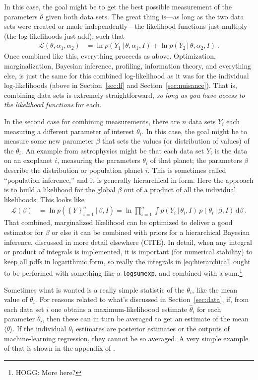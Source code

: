 \documentclass{article}
\newcommand{\sectionname}{Section}
\newcommand{\secref}[1]{\sectionname~\ref{#1}}
\newcommand{\dd}{\mathrm{d}}
\newcommand{\given}{\,|\,}
\newcommand{\setof}[1]{\left\{{#1}\right\}}
\begin{document}
In this case, the goal might be to get the best possible measurement of the parameters $\theta$ given both data sets.
The great thing is---as long as the two data sets were created or made independently---the likelihood functions just multiply (the log likelihoods just add), such that
\begin{align}
    \mathscr{L}(\theta,\alpha_1,\alpha_2) &= \ln p(Y_1\given\theta,\alpha_1,I) + \ln p(Y_2\given\theta,\alpha_2,I) ~.\label{eq:combineLFs}
\end{align}
Once combined like this, everything proceeds as above.
Optimization, marginalization, Bayesian inference, profiling, information theory, and everything else, is just the same for this combined log-likelihood as it was for the individual log-likelihoods (above in \secref{sec:lf} and \secref{sec:nuisance}).
That is, combining data sets is extremely straightforward, \emph{so long as you have access to the likelihood functions} for each.

In the second case for combining measurements, there are $n$ data sets $Y_i$ each measuring a different parameter of interest $\theta_i$.
In this case, the goal might be to measure some new parameter $\beta$ that sets the values (or distribution of values) of the $\theta_i$.
An example from astrophysics might be that each data set $Y_i$ is the data on an exoplanet $i$, measuring the parameters $\theta_i$ of that planet; the parameters $\beta$ describe the distribution or population planet $i$.
This is sometimes called ``population inference,'' and it is generally hierarchical in form.
Here the approach is to build a likelihood for the global $\beta$ out of a product of all the individual likelihoods.
This looks like
\begin{align}
    \mathscr{L}(\beta) &= \ln p(\setof{Y}_{i=1}^n\given\beta,I)
    = \ln\prod_{i=1}^n \int p(Y_i\given\theta_i,I)\,p(\theta_i\given\beta,I)\,\dd\beta ~.\label{eq:hierarchical}
\end{align}
That combined, marginalized likelihood can be optimized to deliver a good estimator for $\beta$ or else it can be combined with priors for a hierarchical Bayesian inference, discussed in more detail elsewhere (CITE).
In detail, when any integral or product of integrals is implemented, it is important (for numerical stability) to keep all pdfs in logarithmic form, so really the integrals in \eqref{eq:hierarchical} ought to be performed with something like a \texttt{logsumexp}, and combined with a sum.\footnote{HOGG: More here?}

Sometimes what is wanted is a really simple statistic of the $\theta_i$, like the mean value of $\theta_i$.
For reasons related to what's discussed in \secref{sec:data}, if, from each data set $i$ one obtains a maximum-likelihoood estimate $\hat\theta_i$ for each parameter $\theta_i$, then these can in turn be averaged to get an estimate of the mean $\langle\theta\rangle$.
If the individual $\theta_i$ estimates are posterior estimates or the outputs of machine-learning regression, they cannot be so averaged.
A very simple example of that is shown in the appendix of \cite{goodorbad}.
\end{document}
